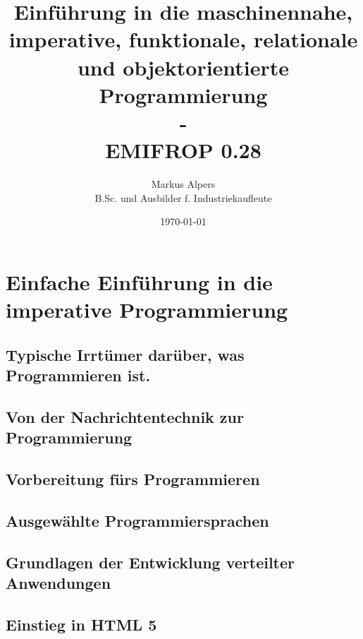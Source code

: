 \documentclass[11pt, a4paper, oneside, draft]{book}
\begin{document}

\title{Einführung in die maschinennahe, imperative, funktionale, relationale und objektorientierte Programmierung\\-\\EMIFROP 0.28}
\author{Markus Alpers\\B.Sc. und Ausbilder f. Industriekaufleute}
\date{\today}

\maketitle


\tableofcontents


%

\part{Einfache Einführung in die imperative Programmierung}

%
\chapter[Das ist Programmieren (wirklich)]{Typische Irrtümer darüber, was Programmieren ist.}
%
\chapter[Nachrichtentechnik und Programmierung]{Von der Nachrichtentechnik zur Programmierung}
%
\chapter{Vorbereitung fürs Programmieren}
%
\chapter{Ausgewählte Programmiersprachen}

%
\chapter[Grundlagen verteilter Anwendungen]{Grundlagen der Entwicklung verteilter Anwendungen}
%
\chapter{Einstieg in HTML 5}

%
\end{document}
